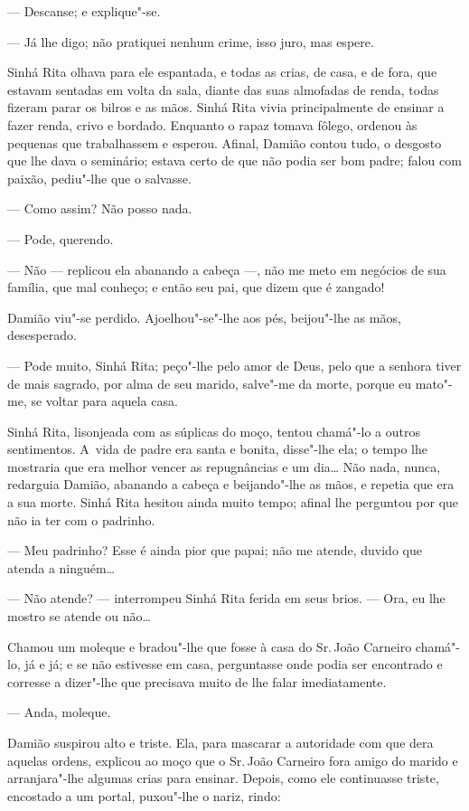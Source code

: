 \begin{linenumbers}
--- Descanse; e explique"-se.

--- Já lhe digo; não pratiquei nenhum crime, isso juro, mas espere.

Sinhá Rita olhava para ele espantada, e todas as crias, de casa, e de
fora, que estavam sentadas em volta da sala, diante das suas almofadas
de renda, todas fizeram parar os bilros e as mãos. Sinhá Rita vivia
principalmente de ensinar a fazer renda, crivo e bordado. Enquanto o
rapaz tomava fôlego, ordenou às pequenas que trabalhassem e esperou.
Afinal, Damião contou tudo, o desgosto que lhe dava o seminário; estava
certo de que não podia ser bom padre; falou com paixão, pediu"-lhe que o
salvasse.

--- Como assim? Não posso nada.

--- Pode, querendo.

--- Não --- replicou ela abanando a cabeça ---, não me meto em negócios de
sua família, que mal conheço; e então seu pai, que dizem que é zangado!

Damião viu"-se perdido. Ajoelhou"-se"-lhe aos pés, beijou"-lhe as mãos,
desesperado.

--- Pode muito, Sinhá Rita; peço"-lhe pelo amor de Deus, pelo que a
senhora tiver de mais sagrado, por alma de seu marido, salve"-me da
morte, porque eu mato"-me, se voltar para aquela casa.

Sinhá Rita, lisonjeada com as súplicas do moço, tentou chamá"-lo a outros
sentimentos. A~vida de padre era santa e bonita, disse"-lhe ela; o tempo
lhe mostraria que era melhor vencer as repugnâncias e um dia\ldots{} Não
nada, nunca, redarguia Damião, abanando a cabeça e beijando"-lhe as mãos,
e repetia que era a sua morte. Sinhá Rita hesitou ainda muito tempo;
afinal lhe perguntou por que não ia ter com o padrinho.

--- Meu padrinho? Esse é ainda pior que papai; não me atende, duvido que
atenda a ninguém\ldots{}

--- Não atende? --- interrompeu Sinhá Rita ferida em seus brios. --- Ora,
eu lhe mostro se atende ou não\ldots{}

Chamou um moleque e bradou"-lhe que fosse à casa do Sr.\,João Carneiro
chamá"-lo, já e já; e se não estivesse em casa, perguntasse onde podia
ser encontrado e corresse a dizer"-lhe que precisava muito de lhe falar
imediatamente.

--- Anda, moleque.

Damião suspirou alto e triste. Ela, para mascarar a autoridade com que
dera aquelas ordens, explicou ao moço que o Sr.\,João Carneiro fora amigo
do marido e arranjara"-lhe algumas crias para ensinar. Depois, como ele
continuasse triste, encostado a um portal, puxou"-lhe o nariz, rindo:


\end{linenumbers}
